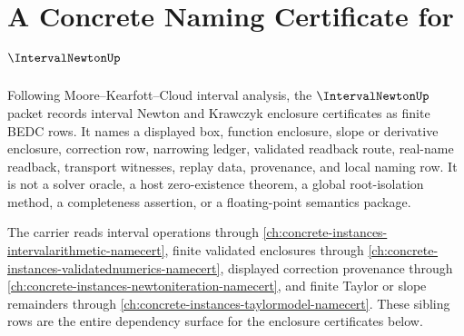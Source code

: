\chapter{A Concrete Naming Certificate for $\IntervalNewtonUp$}
\label{ch:concrete-instances-intervalnewton-namecert}

Following Moore--Kearfott--Cloud interval analysis, the $\IntervalNewtonUp$ packet records interval Newton and Krawczyk enclosure certificates as finite BEDC rows. It names a displayed box, function enclosure, slope or derivative enclosure, correction row, narrowing ledger, validated readback route, real-name readback, transport witnesses, replay data, provenance, and local naming row. It is not a solver oracle, a host zero-existence theorem, a global root-isolation method, a completeness assertion, or a floating-point semantics package.

The carrier reads interval operations through \autoref{ch:concrete-instances-intervalarithmetic-namecert}, finite validated enclosures through \autoref{ch:concrete-instances-validatednumerics-namecert}, displayed correction provenance through \autoref{ch:concrete-instances-newtoniteration-namecert}, and finite Taylor or slope remainders through \autoref{ch:concrete-instances-taylormodel-namecert}. These sibling rows are the entire dependency surface for the enclosure certificates below.

